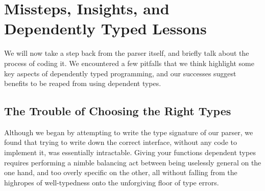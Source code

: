 

\section{Missteps, Insights, and Dependently Typed Lessons} \label{sec:lessons}
  We will now take a step back from the parser itself, and briefly talk about the process of coding it.  We encountered a few pitfalls that we think highlight some key aspects of dependently typed programming, and our successes suggest benefits to be reaped from using dependent types.

  \subsection{The Trouble of Choosing the Right Types}
    Although we began by attempting to write the type signature of our parser, we found that trying to write down the correct interface, without any code to implement it, was essentially intractable.  Giving your functions dependent types requires performing a nimble balancing act between being uselessly general on the one hand, and too overly specific on the other, all without falling from the highropes of well-typedness onto the unforgiving floor of type errors.

